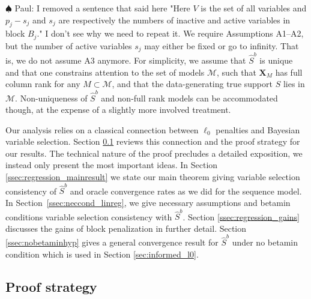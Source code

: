 \documentclass[aos]{imsart}
\theoremstyle{plain}
\newcommand{\paul}[1]{{\small{\color{green} \sf $\spadesuit$ Paul: #1}}}
\newcommand{\M}{\mathcal{M}}
\newcommand{\bs}{\boldsymbol}
\begin{document}
\paul{I removed a sentence that said here "Here $V$ is the set of all variables and $p_j-s_j$ and $s_j$ are respectively the numbers of inactive and active variables in block $B_j$." I don't see why we need to repeat it.} We require Assumptions A1--A2, but the number of active variables $s_j$ may either be fixed or go to infinity. 
That is, we do not assume A3 anymore. For simplicity, we assume that $\hat{S}^b$ is unique and that one constrains attention to the set of models $\M$,
such that
$\bs X_M$ has full column rank for any $M \subset \M$, and that the data-generating true support $S$ lies in $\M$. Non-uniqueness of $\hat{S}^b$ and non-full rank models can be accommodated though, at the expense of a slightly more involved treatment.

Our analysis relies on a classical connection
between $\ell_0$ penalties and Bayesian variable selection. 
Section \ref{ssec:regression_proof_strategy} reviews this connection and the proof strategy for our results.
The technical nature of the proof precludes a detailed exposition, we instead only present the most important ideas.
In Section \ref{ssec:regression_mainresult} we state our main theorem
giving variable selection consistency of $\hat{S}^{b}$ and oracle convergence rates as we did for the sequence model. In Section~\ref{ssec:neccond_linreg}, we  give necessary assumptions and betamin conditions variable selection consistency with $\hat{S}^{b}$. Section \ref{ssec:regression_gains} discusses the gains of block penalization in further detail. Section \ref{ssec:nobetaminhyp} gives a general convergence result for $\hat{S}^{b}$ under no betamin condition which is used in Section \ref{sec:informed_l0}.


\subsection{Proof strategy}
\label{ssec:regression_proof_strategy}
\end{document}
